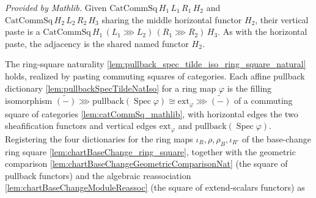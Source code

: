 \begin{lemma}
  \label{lem:catCommSq_vComp_mathlib}
  \mathlibok
  \textit{Provided by Mathlib.}
  Given \(\mathrm{CatCommSq}\,H_1\,L_1\,R_1\,H_2\) and \(\mathrm{CatCommSq}\,H_2\,L_2\,R_2\,H_3\)
  sharing the middle horizontal functor \(H_2\), their vertical paste is a
  \(\mathrm{CatCommSq}\,H_1\,(L_1 \ggg L_2)\,(R_1 \ggg R_2)\,H_3\). As with the horizontal paste, the
  adjacency is the shared named functor \(H_2\).
\end{lemma}

\begin{lemma}

  \label{lem:pullback_spec_tilde_iso_ring_square_natural_catCommSq}
  The ring-square naturality \cref{lem:pullback_spec_tilde_iso_ring_square_natural} holds, realized by
  pasting commuting squares of categories. Each affine pullback dictionary
  \cref{lem:pullbackSpecTildeNatIso} for a ring map \(\varphi\) is the filling isomorphism
  \(\widetilde{(-)} \ggg \mathrm{pullback}(\operatorname{Spec}\varphi) \cong
  \mathrm{ext}_\varphi \ggg \widetilde{(-)}\) of a commuting square of categories
  \cref{lem:catCommSq_mathlib}, with horizontal edges the two sheafification functors and vertical
  edges \(\mathrm{ext}_\varphi\) and \(\mathrm{pullback}(\operatorname{Spec}\varphi)\). Registering
  the four dictionaries for the ring maps \(\iota_R,\rho,\rho_B,\iota_{R'}\) of the base-change ring
  square \cref{lem:chartBaseChange_ring_square}, together with the geometric comparison
  \cref{lem:chartBaseChangeGeometricComparisonNat} (the square of pullback functors) and the algebraic
  reassociation \cref{lem:chartBaseChangeModuleReassoc} (the square of extend-scalars functors) as

\end{lemma}
